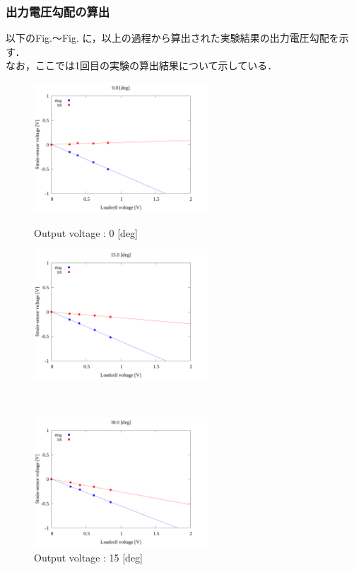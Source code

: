 \subsubsection{出力電圧勾配の算出}

\newpage

以下のFig.～Fig. に，以上の過程から算出された実験結果の出力電圧勾配を示す．\\
なお，ここでは1回目の実験の算出結果について示している．

\begin{figure}[htbp]
    \begin{minipage}[b]{0.45\linewidth}
      \centering
      \includegraphics[width=65mm]{../../02_workspace/result/2-1/plot/04/04_linear_0.png}
      \caption{Output voltage : 0 [deg]}
    \end{minipage}
    \begin{minipage}[b]{0.45\linewidth}
      \centering
      \includegraphics[width=65mm]{../../02_workspace/result/2-1/plot/04/04_linear_150.png}
      \caption{Output voltage : 15 [deg]}
    \end{minipage} \\
    \begin{minipage}[b]{0.45\linewidth}
        \centering
        \includegraphics[width=65mm]{../../02_workspace/result/2-1/plot/04/04_linear_300.png}

\end{minipage}
\end{figure}
